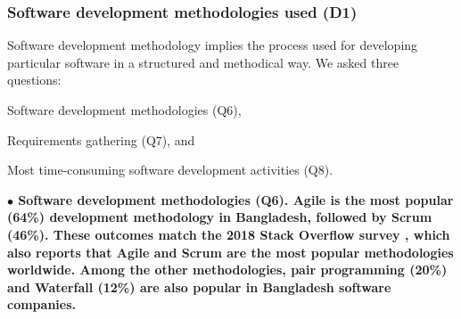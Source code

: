 \subsubsection{Software development methodologies used (D1)}
\label{methodology}

Software development methodology implies the process used for developing
particular software in a structured and methodical
way. We asked three questions: \begin{inparaenum}
\item Software development methodologies (Q6),
\item Requirements gathering (Q7), and
\item Most time-consuming software development activities (Q8).
\end{inparaenum}

\nd\bf{$\bullet$ Software development methodologies (Q6).} Agile is the most popular (64\%) development methodology in Bangladesh, followed by Scrum (46\%). These outcomes match the 2018 Stack Overflow
survey \citep{StackoverflowSurvey2018}, which also reports that Agile and Scrum
are the most popular methodologies worldwide. Among the other methodologies, 
pair programming (20\%) and Waterfall (12\%) are also popular in Bangladesh software companies.

